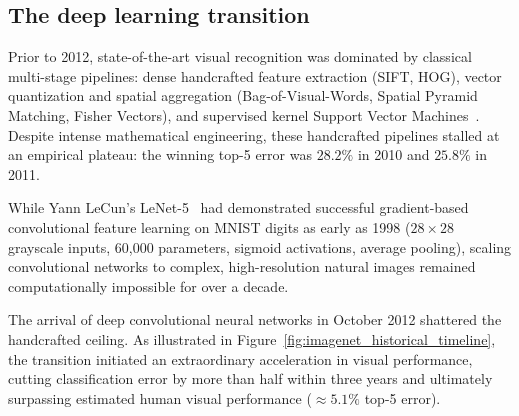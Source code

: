 \subsection{The deep learning transition}
\label{sec:deep_learning_transition}

Prior to 2012, state-of-the-art visual recognition was dominated by classical multi-stage pipelines: dense handcrafted feature extraction (SIFT, HOG), vector quantization and spatial aggregation (Bag-of-Visual-Words, Spatial Pyramid Matching, Fisher Vectors), and supervised kernel Support Vector Machines~\cite{lowe2004distinctive,dalal2005histograms}. Despite intense mathematical engineering, these handcrafted pipelines stalled at an empirical plateau: the winning top-5 error was $28.2\%$ in 2010 and $25.8\%$ in 2011.

While Yann LeCun's LeNet-5~\cite{lecun1998gradient} had demonstrated successful gradient-based convolutional feature learning on MNIST digits as early as 1998 ($28 \times 28$ grayscale inputs, 60,000 parameters, sigmoid activations, average pooling), scaling convolutional networks to complex, high-resolution natural images remained computationally impossible for over a decade.

The arrival of deep convolutional neural networks in October 2012 shattered the handcrafted ceiling. As illustrated in Figure~\ref{fig:imagenet_historical_timeline}, the transition initiated an extraordinary acceleration in visual performance, cutting classification error by more than half within three years and ultimately surpassing estimated human visual performance ($\approx 5.1\%$ top-5 error).

